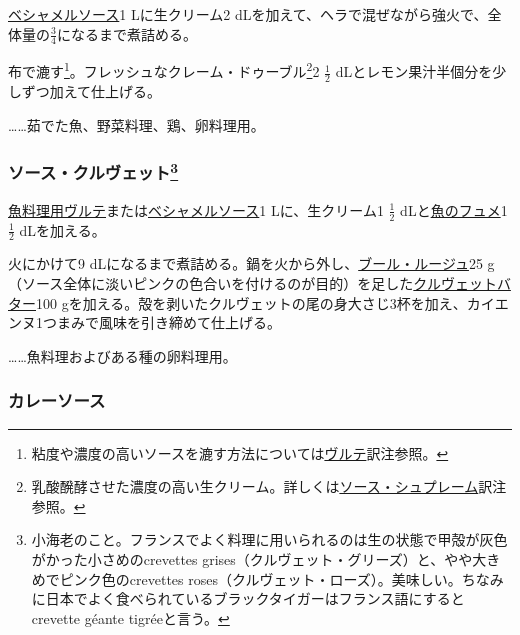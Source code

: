 \begin{recette}
\protect\hyperlink{sauce-bechamel}{ベシャメルソース}1 Lに生クリーム2
dLを加えて、ヘラで混ぜながら強火で、全体量の\(\frac{3}{4}\)になるまで煮詰める。

布で漉す\footnote{粘度や濃度の高いソースを漉す方法については\protect\hyperlink{veloute}{ヴルテ}訳注参照。}。フレッシュなクレーム・ドゥーブル\footnote{乳酸醗酵させた濃度の高い生クリーム。詳しくは\protect\hyperlink{sauce-supreme}{ソース・シュプレーム}訳注参照。}2
\(\frac{1}{2}\) dLとレモン果汁半個分を少しずつ加えて仕上げる。

\ldots{}\ldots{}茹でた魚、野菜料理、鶏、卵料理用。

\hypertarget{sauce-aux-crevettes}{%
\subsubsection[ソース・クルヴェット]{\texorpdfstring{ソース・クルヴェット\footnote{小海老のこと。フランスでよく料理に用いられるのは生の状態で甲殻が灰色がかった小さめのcrevettes
  grises（クルヴェット・グリーズ）と、やや大きめでピンク色のcrevettes
  roses（クルヴェット・ローズ）。美味しい。ちなみに日本でよく食べられているブラックタイガーはフランス語にするとcrevette
  géante tigréeと言う。}}{ソース・クルヴェット}}\label{sauce-aux-crevettes}}



\protect\hyperlink{veloute-de-poisson}{魚料理用ヴルテ}または\protect\hyperlink{sauce-bechamel}{ベシャメルソース}1
Lに、生クリーム1 \(\frac{1}{2}\)
dLと\protect\hyperlink{fumet-de-poisson}{魚のフュメ}1 \(\frac{1}{2}\)
dLを加える。

火にかけて9
dLになるまで煮詰める。鍋を火から外し、\protect\hyperlink{}{ブール・ルージュ}25
g（ソース全体に淡いピンクの色合いを付けるのが目的）を足した\protect\hyperlink{}{クルヴェットバター}100
gを加える。殻を剥いたクルヴェットの尾の身大さじ3杯を加え、カイエンヌ1つまみで風味を引き締めて仕上げる。

\ldots{}\ldots{}魚料理およびある種の卵料理用。

\hypertarget{sauce-currie}{%
\subsubsection{カレーソース}\label{sauce-currie}}


\end{recette}
